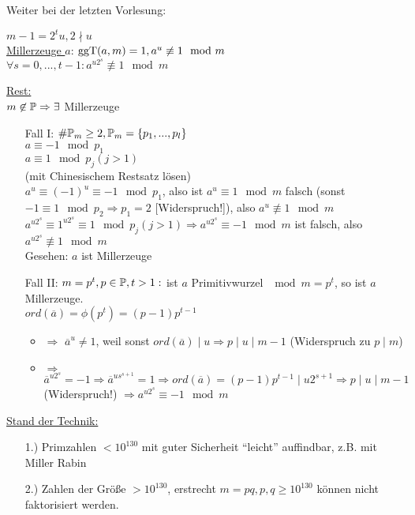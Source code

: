 \documentclass[a4paper,DIV15,BCOR12mm]{article}
\begin{document}
Weiter bei der letzten Vorlesung:

$m-1 = 2^tu, 2 \nmid u$\\
\underline{Millerzeuge $a$}: $\mathop{\rm ggT}\nolimits (a,m) = 1, a^u \not\equiv 1 \mod m$\\
$\forall s = 0, ..., t-1: a^{u2^s} \not\equiv 1 \mod m$

\underline{Rest:}\\
$m \not\in \mathbb{P} \Rightarrow \exists$ Millerzeuge
\begin{itemize}
    \item[Fall I:] $\#\mathbb{P}_m \ge 2, \mathbb{P}_m = \{p_1,...,p_l\}$\\
        $a \equiv -1 \mod p_1$\\
        $a \equiv 1 \mod p_j (j > 1)$\\
        (mit Chinesischem Restsatz lösen)\\
        $a^u \equiv (-1)^u \equiv -1 \mod p_1$, also ist $a^u \equiv 1 \mod m$ falsch (sonst $-1 \equiv 1 \mod p_2 \Rightarrow p_1 = 2$ [Widerspruch!]), also $a^u \not\equiv 1 \mod m$\\
        $a^{u2^s} \equiv 1^{u2^s} \equiv 1 \mod p_j (j > 1) \Rightarrow a^{u2^s} \equiv -1 \mod m$ ist falsch, also $a^{u2^s} \not\equiv 1 \mod m$\\
        Gesehen: $a$ ist Millerzeuge
    \item[Fall II:] $m = p^t, p \in \mathbb{P}, t > 1:$ ist $a$ Primitivwurzel $\mod m = p^t$, so ist $a$ Millerzeuge.\\
        $ord(\overline a) = \phi(p^t) = (p-1)p^{t-1}$
        \begin{itemize}
            \item{ $\Rightarrow$} $\overline a^u \not= 1$, weil sonst $ord(\overline a) \mid u \Rightarrow p \mid u \mid m-1$ (Widerspruch zu $p \mid m$)
            \item{ $\Rightarrow$} $\overline a^{u2^s} = -1 \Rightarrow \overline a^{us^{s+1}} = 1 \Rightarrow ord(\overline a) = (p-1)p^{t-1} \mid u2^{s+1} \Rightarrow p \mid u \mid m-1$ (Widerspruch!) $\Rightarrow a^{u2^s} \equiv -1 \mod m$
        \end{itemize}
\end{itemize}

\underline{Stand der Technik:}
\begin{itemize}
    \item[1.)] Primzahlen $< 10^{130}$ mit guter Sicherheit "`leicht"' auffindbar, z.B. mit Miller Rabin
    \item[2.)] Zahlen der Größe $> 10^{130}$, erstrecht $m = pq, p,q \ge 10^{130}$ können nicht faktorisiert werden.
\end{itemize}
\end{document}
